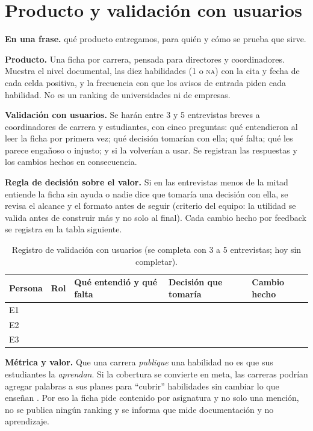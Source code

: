 \documentclass[11pt,a4paper]{article}
\newcommand{\NA}{\textsc{na}}
\begin{document}
\section{Producto y validación con usuarios}
\begin{enunasola}\textbf{En una frase.} qué producto entregamos, para quién y cómo se prueba que sirve.\end{enunasola}

\textbf{Producto.} Una ficha por carrera, pensada para directores y coordinadores. Muestra el nivel documental, las diez habilidades (1 o \NA{}) con la cita y fecha de cada celda positiva, y la frecuencia con que los avisos de entrada piden cada habilidad. No es un ranking de universidades ni de empresas.

\textbf{Validación con usuarios.} Se harán entre 3 y 5 entrevistas breves a coordinadores de carrera y estudiantes, con cinco preguntas: qué entendieron al leer la ficha por primera vez; qué decisión tomarían con ella; qué falta; qué les parece engañoso o injusto; y si la volverían a usar. Se registran las respuestas y los cambios hechos en consecuencia.

\textbf{Regla de decisión sobre el valor.} Si en las entrevistas menos de la mitad entiende la ficha sin ayuda o nadie dice que tomaría una decisión con ella, se revisa el alcance y el formato antes de seguir (criterio del equipo: la utilidad se valida antes de construir más y no solo al final). Cada cambio hecho por feedback se registra en la tabla siguiente.

\begin{table}[H]
\centering\small
\begin{tabular}{L{1.3cm} L{2.4cm} L{3.6cm} L{3.6cm} L{3.4cm}}
\toprule
\textbf{Persona} & \textbf{Rol} & \textbf{Qué entendió y qué falta} & \textbf{Decisión que tomaría} & \textbf{Cambio hecho}\\
\midrule
E1 & & & & \\
E2 & & & & \\
E3 & & & & \\
\bottomrule
\end{tabular}
\caption{Registro de validación con usuarios (se completa con 3 a 5 entrevistas; hoy sin completar).}
\end{table}

\textbf{Métrica y valor.} Que una carrera \emph{publique} una habilidad no es que sus estudiantes la \emph{aprendan}. Si la cobertura se convierte en meta, las carreras podrían agregar palabras a sus planes para ``cubrir'' habilidades sin cambiar lo que enseñan \cite{strathern1997}. Por eso la ficha pide contenido por asignatura y no solo una mención, no se publica ningún ranking y se informa que mide documentación y no aprendizaje.
\end{document}

